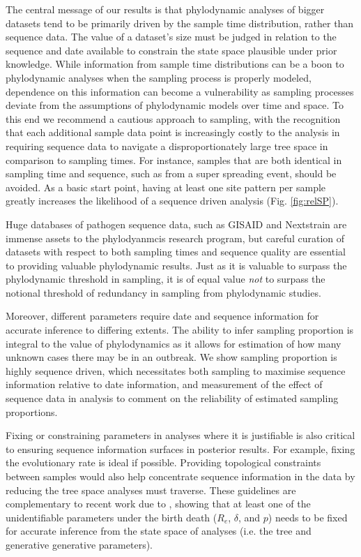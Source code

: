 \documentclass{article}
\begin{document}
The central message of our results is that phylodynamic analyses of bigger datasets tend to be primarily driven by the sample time distribution, rather than sequence data. The value of a dataset's size must be judged in relation to the sequence and date available to constrain the state space plausible under prior knowledge. While information from sample time distributions can be a boon to phylodynamic analyses when the sampling process is properly modeled, dependence on this information can become a vulnerability as sampling processes deviate from the assumptions of phylodynamic models over time and space. To this end we recommend a cautious approach to sampling, with the recognition that each additional sample data point is increasingly costly to the analysis in requiring sequence data to navigate a disproportionately large tree space in comparison to sampling times. For instance, samples that are both identical in sampling time and sequence, such as from a super spreading event, should be avoided. As a basic start point, having at least one site pattern per sample greatly increases the likelihood of a sequence driven analysis (Fig. \ref{fig:relSP}).

Huge databases of pathogen sequence data, such as GISAID and Nextstrain are immense assets to the phylodyanmcis research program, but careful curation of datasets with respect to both sampling times and sequence quality are essential to providing valuable phylodynamic results. Just as it is valuable to surpass the phylodynamic threshold in sampling, it is of equal value \textit{not} to surpass the notional threshold of redundancy in sampling from phylodynamic studies.

Moreover, different parameters require date and sequence information for accurate inference to differing extents. The ability to infer sampling proportion is integral to the value of phylodynamics as it allows for estimation of how many unknown cases there may be in an outbreak. We show sampling proportion is highly sequence driven, which necessitates both sampling to maximise sequence information relative to date information, and measurement of the effect of sequence data in analysis to comment on the reliability of estimated sampling proportions.

Fixing or constraining parameters in analyses where it is justifiable is also critical to ensuring sequence information surfaces in posterior results. For example, fixing the evolutionary rate is ideal if possible. Providing topological constraints between samples would also help concentrate sequence information in the data by reducing the tree space analyses must traverse. These guidelines are complementary to recent work due to \citet{louca2021fundamental}, showing that at least one of the unidentifiable parameters under the birth death ($R_e$, $\delta$, and $p$) needs to be fixed for accurate inference from the state space  of analyses (i.e. the tree and generative generative parameters).
\end{document}
